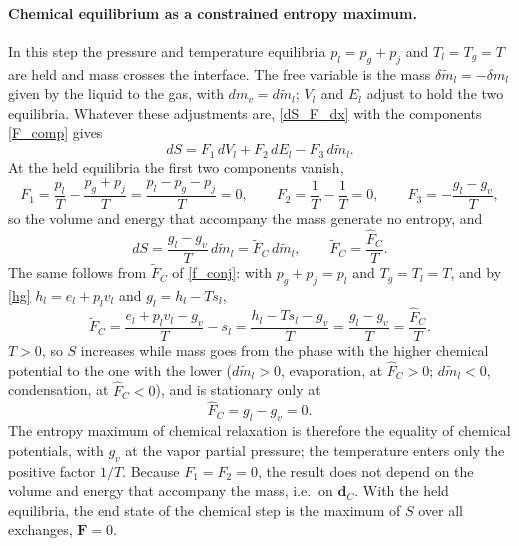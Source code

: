 \paragraph{Chemical equilibrium as a constrained entropy maximum.}
In this step the pressure and temperature equilibria $p_l=p_g+p_{j}$ and $T_l=T_g=T$ are held and mass crosses the interface. The free variable is the mass $\delta\tilde{m}_l=-\delta m_l$ given by the liquid to the gas, with $dm_v=d\tilde{m}_l$; $V_l$ and $E_l$ adjust to hold the two equilibria. Whatever these adjustments are, \eqref{dS_F_dx} with the components \eqref{F_comp} gives
\begin{equation}\label{dS_C_full}
dS=F_1\,dV_l+F_2\,dE_l-F_3\,d\tilde{m}_l.
\end{equation}
At the held equilibria the first two components vanish,
\begin{equation}\label{F12_zero}
F_1=\frac{p_l}{T}-\frac{p_g+p_{j}}{T}=\frac{p_l-p_g-p_{j}}{T}=0,\qquad F_2=\frac1T-\frac1T=0,\qquad F_3=-\frac{g_l-g_v}{T},
\end{equation}
so the volume and energy that accompany the mass generate no entropy, and
\begin{equation}\label{dS_C_sum}
dS=\frac{g_l-g_v}{T}\,d\tilde{m}_l=\tilde{F}_C\,d\tilde{m}_l,\qquad \tilde{F}_C=\frac{\hat{F}_C}{T}.
\end{equation}
The same follows from $\tilde{F}_C$ of \eqref{f_conj}: with $p_g+p_{j}=p_l$ and $T_g=T_l=T$, and by \eqref{hg} $h_l=e_l+p_lv_l$ and $g_l=h_l-Ts_l$,
\begin{equation}\label{fC_steps}
\tilde{F}_C=\frac{e_l+p_lv_l-g_v}{T}-s_l=\frac{h_l-Ts_l-g_v}{T}=\frac{g_l-g_v}{T}=\frac{\hat{F}_C}{T}.
\end{equation}
$T>0$, so $S$ increases while mass goes from the phase with the higher chemical potential to the one with the lower ($d\tilde{m}_l>0$, evaporation, at $\hat{F}_C>0$; $d\tilde{m}_l<0$, condensation, at $\hat{F}_C<0$), and is stationary only at
\begin{equation}
\hat{F}_C=g_l-g_v=0 .
\end{equation}
The entropy maximum of chemical relaxation is therefore the equality of chemical potentials, with $g_v$ at the vapor partial pressure; the temperature enters only the positive factor $1/T$. Because $F_1=F_2=0$, the result does not depend on the volume and energy that accompany the mass, i.e.\ on $\boldsymbol{d}_C$. With the held equilibria, the end state of the chemical step is the maximum of $S$ over all exchanges, $\boldsymbol{F}=0$.


